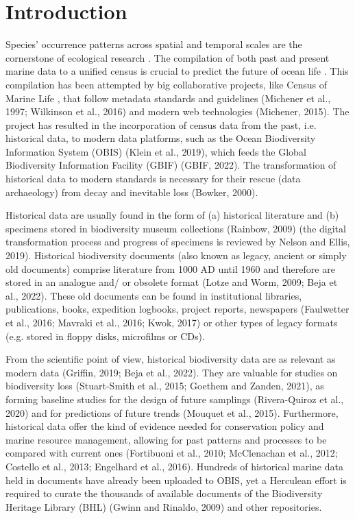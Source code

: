 \section{Introduction}
\label{sec:deco-intro}
Species’ occurrence patterns across spatial and temporal scales are the 
cornerstone of ecological research \citep{levin_problem_1992}. The compilation of both past 
and present marine data to a unified census is crucial to predict the future of 
ocean life \citep{ausubel_guest_1999, anderson_does_2006, lo_brutto_historical_2021}. This compilation has 
been attempted by big collaborative projects, like Census of Marine Life \citep{vermeulen_understanding_2013}, 
that follow metadata standards and guidelines (Michener et al., 1997; Wilkinson et al., 2016) 
and modern web technologies (Michener, 2015). The project has resulted in the incorporation 
of census data from the past, i.e. historical data, to modern data platforms, such 
as the Ocean Biodiversity Information System (OBIS) (Klein et al., 2019), which feeds 
the Global Biodiversity Information Facility (GBIF) (GBIF, 2022). The transformation of 
historical data to modern standards is necessary for their rescue (data archaeology)
from decay and inevitable loss (Bowker, 2000).

Historical data are usually found in the form of (a) historical literature and 
(b) specimens stored in biodiversity museum collections (Rainbow, 2009) (the 
digital transformation process and progress of specimens is reviewed by Nelson and Ellis, 2019). 
Historical biodiversity documents (also known as legacy, ancient or simply old 
documents) comprise literature from 1000 AD until 1960 and therefore are stored 
in an analogue and/ or obsolete format (Lotze and Worm, 2009; Beja et al., 2022). 
These old documents can be found in institutional libraries, publications, books, 
expedition logbooks, project reports, newspapers (Faulwetter et al., 2016; Mavraki et al., 2016; Kwok, 2017) 
or other types of legacy formats (e.g. stored in floppy disks, microfilms or CDs).

From the scientific point of view, historical biodiversity data are as relevant 
as modern data (Griffin, 2019; Beja et al., 2022). They are valuable for studies on biodiversity loss (Stuart-Smith et al., 2015; Goethem and Zanden, 2021), as forming baseline studies for the design of future samplings (Rivera-Quiroz et al., 2020) and for predictions of future trends (Mouquet et al., 2015). Furthermore, historical data offer the kind of evidence needed for conservation policy and marine resource management, allowing for past patterns and processes to be compared with current ones (Fortibuoni et al., 2010; McClenachan et al., 2012; Costello et al., 2013; Engelhard et al., 2016). Hundreds of historical marine data held in documents have already been uploaded to OBIS, yet a Herculean effort is required to curate the thousands of available documents of the Biodiversity Heritage Library (BHL) (Gwinn and Rinaldo, 2009) and other repositories.

